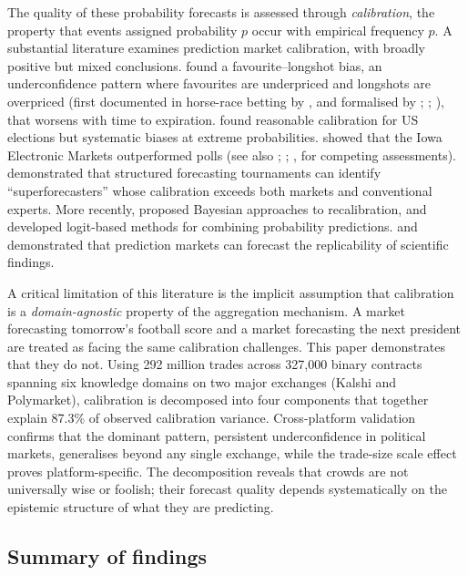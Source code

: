 \documentclass[numsec,webpdf,modern,medium]{oup-authoring-template}
\theoremstyle{thmstyleone}%
\theoremstyle{thmstyletwo}%
\theoremstyle{thmstylethree}%
\begin{document}
The quality of these probability forecasts is assessed through \emph{calibration}, the property that events assigned probability $p$ occur with empirical frequency $p$. A substantial literature examines prediction market calibration, with broadly positive but mixed conclusions. \citet{page2013prediction} found a favourite--longshot bias, an underconfidence pattern where favourites are underpriced and longshots are overpriced (first documented in horse-race betting by \citealp{griffith1949odds}, and formalised by \citealp{ali1977probability}; \citealp{thaler1988anomalies}; \citealp{snowberg2010explaining}), that worsens with time to expiration. \citet{rothschild2009forecasting} found reasonable calibration for US elections but systematic biases at extreme probabilities. \citet{berg2008prediction} showed that the Iowa Electronic Markets outperformed polls (see also \citealp{servanschreiber2004prediction}; \citealp{erikson2008political}; \citealp{leigh2006competing}, for competing assessments). \citet{tetlock2015superforecasting} demonstrated that structured forecasting tournaments can identify ``superforecasters'' whose calibration exceeds both markets and conventional experts. More recently, \citet{liu2024boldness} proposed Bayesian approaches to recalibration, and \citet{satopaa2014combining} developed logit-based methods for combining probability predictions. \citet{dreber2015using} and \citet{camerer2016evaluating} demonstrated that prediction markets can forecast the replicability of scientific findings.

A critical limitation of this literature is the implicit assumption that calibration is a \emph{domain-agnostic} property of the aggregation mechanism. A market forecasting tomorrow's football score and a market forecasting the next president are treated as facing the same calibration challenges. This paper demonstrates that they do not. Using 292 million trades across 327,000 binary contracts spanning six knowledge domains on two major exchanges (Kalshi and Polymarket), calibration is decomposed into four components that together explain 87.3\% of observed calibration variance. Cross-platform validation confirms that the dominant pattern, persistent underconfidence in political markets, generalises beyond any single exchange, while the trade-size scale effect proves platform-specific. The decomposition reveals that crowds are not universally wise or foolish; their forecast quality depends systematically on the epistemic structure of what they are predicting.
\subsection{Summary of findings}\label{sec:summary}
\end{document}
